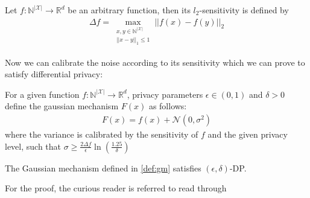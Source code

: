 \begin{definition}[$l_2$-sensitivity]
    Let $f:\mathbb{N}^{|\mathcal{X}|} \longrightarrow \mathbb{R}^d$ be an arbitrary function, then its $l_2$-sensitivity is defined by
    \begin{align}
        \Delta f = \max_{\substack{x,y \in \mathbb{N}^{|\mathcal{X}|} \\ ||x-y||_1\le 1}} ||f(x)-f(y)||_2 
    \end{align}
\end{definition}

Now we can calibrate the noise according to its sensitivity which we can prove to satisfy differential privacy:
\begin{definition}\label{def:gm}
    For a given function  $f:\mathbb{N}^{|\mathcal{X}|} \longrightarrow \mathbb{R}^d$, privacy parameters $\epsilon \in (0,1)$ and $\delta>0$ define the gaussian mechanism $F(x)$ as follows:
    \begin{align}
        F(x) = f(x) + \mathcal{N}(0, \sigma^2)
    \end{align}
    where the variance is calibrated by the sensitivity of $f$ and the given privacy level, such that $\sigma \ge \frac{2 \Delta f}{\epsilon}\ln(\frac{1.25}{\delta})$
\end{definition}

\begin{thm}
    The Gaussian mechanism defined in \cref{def:gm} satisfies $(\epsilon, \delta)$-DP.
\end{thm}
For the proof, the curious reader is referred to read through \parencite[][Appendix A]{dwork2014algorithmic}